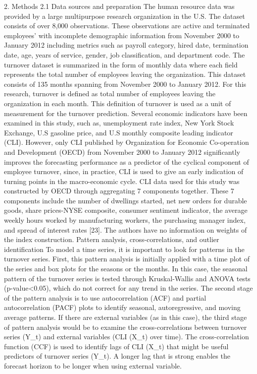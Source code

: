 2.    Methods
2.1    Data sources and preparation
The human resource data was provided by a large multipurpose research organization in the U.S. The dataset consists of over 8,000 observations. These observations are active and terminated employees’ with incomplete demographic information from November 2000 to January 2012 including metrics such as payroll category, hired date, termination date, age, years of service, gender, job classification, and department code. The turnover dataset is summarized in the form of monthly data where each field represents the total number of employees leaving the organization. This dataset consists of 135 months spanning from November 2000 to January 2012. For this research, turnover is defined as total number of employees leaving the organization in each month. This definition of turnover is used as a unit of measurement for the turnover prediction. 
Several economic indicators have been examined in this study, such as, unemployment rate index, New York Stock Exchange, U.S gasoline price, and U.S monthly composite leading indicator (CLI). However, only CLI published by Organization for Economic Co-operation and Development (OECD) from November 2000 to January 2012 significantly improves the forecasting performance as a predictor of the cyclical component of employee turnover, since, in practice, CLI is used to give an early indication of turning points in the macro-economic cycle. CLI data used for this study was constructed by OECD through aggregating 7 components together. These 7 components include the number of dwellings started, net new orders for durable goods, share prices-NYSE composite, consumer sentiment indicator, the average weekly hours worked by manufacturing workers, the purchasing manager index, and spread of interest rates [23]. The authors have no information on weights of the index construction.
Pattern analysis, cross-correlations, and outlier identification
To model a time series, it is important to look for patterns in the turnover series.  First, this pattern analysis is initially applied with a time plot of the series and box plots for the seasons or the months. In this case, the seasonal pattern of the turnover series is tested through Kruskal-Wallis and ANOVA tests (p-value<0.05), which do not correct for any trend in the series. The second stage of the pattern analysis is to use autocorrelation (ACF) and partial autocorrelation (PACF) plots to identify seasonal, autoregressive, and moving average patterns. If there are external variables (as in this case), the third stage of pattern analysis would be to examine the cross-correlations between turnover series (Y_t) and external variables (CLI (X_t) over time). The cross-correlation function (CCF) is used to identify lags of CLI (X_t) that might be useful predictors of turnover series (Y_t).  A longer lag that is strong enables the forecast horizon to be longer when using external variable.
